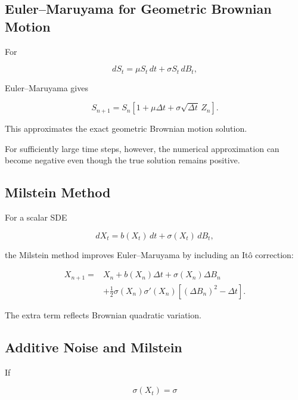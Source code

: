\subsection{Euler--Maruyama for Geometric Brownian Motion}
\label{subsec:euler-maruyama-gbm}

For

\[
dS_t
=
\mu S_t\,dt
+
\sigma S_t\,dB_t,
\]

Euler--Maruyama gives

\[
\boxed{
S_{n+1}
=
S_n
\left[
1
+
\mu\Delta t
+
\sigma\sqrt{\Delta t}\,Z_n
\right].
}
\]

This approximates the exact geometric Brownian motion solution.

For sufficiently large time steps, however, the numerical approximation
can become negative even though the true solution remains positive.

\subsection{Milstein Method}
\label{subsec:milstein-method}

For a scalar SDE

\[
dX_t
=
b(X_t)\,dt
+
\sigma(X_t)\,dB_t,
\]

the Milstein method improves Euler--Maruyama by including an It\^o
correction:

\[
\boxed{
\begin{aligned}
X_{n+1}
={}&
X_n
+
b(X_n)\Delta t
+
\sigma(X_n)\Delta B_n
\\
&+
\frac12
\sigma(X_n)\sigma'(X_n)
\left[
(\Delta B_n)^2-\Delta t
\right].
\end{aligned}
}
\]

The extra term reflects Brownian quadratic variation.

\subsection{Additive Noise and Milstein}
\label{subsec:additive-noise-milstein}

If

\[
\sigma(X_t)=\sigma
\]

